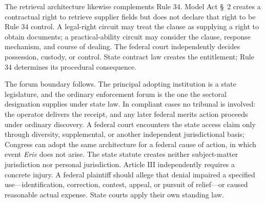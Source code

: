 The retrieval architecture likewise complements Rule 34. Model Act \S~2 creates a contractual right to retrieve supplier fields but does not declare that right to be Rule 34 control. A legal-right circuit may treat the clause as supplying a right to obtain documents; a practical-ability circuit may consider the clause, response mechanism, and course of dealing. The federal court independently decides possession, custody, or control. State contract law creates the entitlement; Rule 34 determines its procedural consequence.

The forum boundary follows. The principal adopting institution is a state legislature, and the ordinary enforcement forum is the one the sectoral designation supplies under state law. In compliant cases no tribunal is involved: the operator delivers the receipt, and any later federal merits action proceeds under ordinary discovery. A federal court encounters the state access claim only through diversity, supplemental, or another independent jurisdictional basis; Congress can adopt the same architecture for a federal cause of action, in which event \emph{Erie} does not arise. The state statute creates neither subject-matter jurisdiction nor personal jurisdiction. Article III independently requires a concrete injury. A federal plaintiff should allege that denial impaired a specified use---identification, correction, contest, appeal, or pursuit of relief---or caused reasonable actual expense. State courts apply their own standing law.

